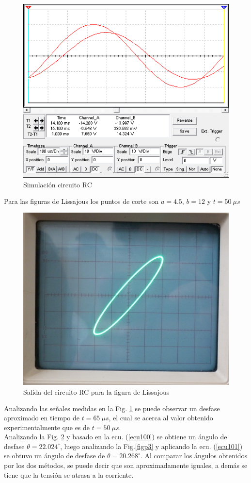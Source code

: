 \documentclass[twocolumn]{IEEEtran}
\begin{document}
\begin{figure}[H]
	\centering
		\includegraphics[scale=0.4]{RCsim.PNG}
	\caption{Simulación circuito RC}
	\label{fig1b}
\end{figure}
\noindent
Para las figuras de Lissajous los puntos de corte son $a = 4.5$, $b= 12$ y $t=50\ \mu s$
\begin{figure}[H]
	\centering
		\includegraphics[scale=0.15]{235.png}
	\caption{Salida del circuito RC para la figura de Lissajous}
	\label{figp4}
\end{figure}
\noindent
Analizando las señales medidas en la Fig. \ref{fig1b} se puede observar un desfase aproximado en tiempo de $t=65\ \mu s$, el cual se acerca al valor obtenido experimentalmente que es de $t=50\ \mu s$.\\
Analizando la Fig. \ref{figp4} y basado en la ecu. (\ref{ecu100}) se obtiene un ángulo de desfase $\theta = 22.024 ^\circ$, luego analizando la Fig.\ref{figp3} y aplicando la ecu. (\ref{ecu101}) se obtuvo un ángulo de desfase de $\theta = 20.268 ^\circ$. Al comparar los ángulos obtenidos por los dos métodos, se puede decir que son aproximadamente iguales, a demás se tiene que la tensión se atrasa a la corriente.
\end{document}
